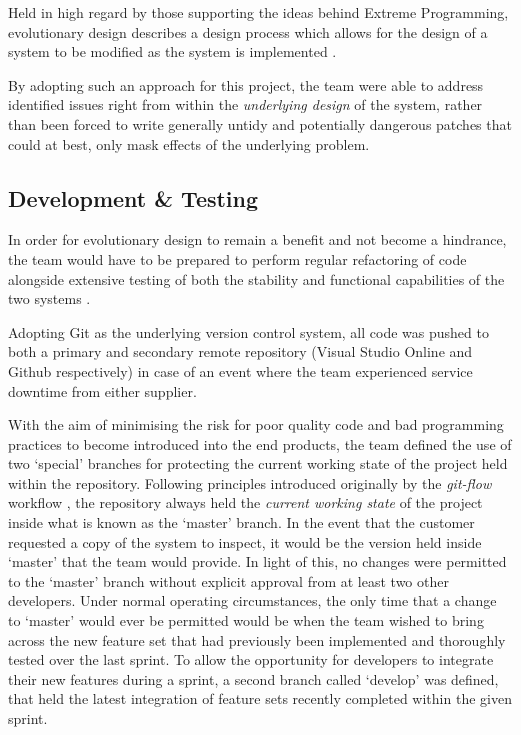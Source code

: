Held in high regard by those supporting the ideas behind Extreme Programming, evolutionary design describes a design process which allows for the design of a system to be modified as the system is implemented \cite{martin-fowler}. 

By adopting such an approach for this project, the team were able to address identified issues right from within the \textit{underlying design} of the system, rather than been forced to write generally untidy and potentially dangerous patches that could at best, only mask effects of the underlying problem.


\subsection{Development \& Testing}

In order for evolutionary design to remain a benefit and not become a hindrance, the team would have to be prepared to perform regular refactoring of code alongside extensive testing of both the stability and functional capabilities of the two systems \cite{martin-fowler}.

Adopting Git as the underlying version control system, all code was pushed to both a primary and secondary remote repository (Visual Studio Online and Github respectively) in case of an event where the team experienced service downtime from either supplier. 

With the aim of minimising the risk for poor quality code and bad programming practices to become introduced into the end products, the team defined the use of two `special' branches for protecting the current working state of the project held within the repository. Following principles introduced originally by the \textit{git-flow} workflow \cite{git-flow}, the repository always held the \textit{current working state} of the project inside what is known as the `master' branch. In the event that the customer requested a copy of the system to inspect, it would be the version held inside `master' that the team would provide. In light of this, no changes were permitted to the  `master' branch without explicit approval from at least two other developers. Under normal operating circumstances, the only time that a change to `master' would ever be permitted would be when the team wished to bring across the new feature set that had previously been implemented and thoroughly tested over the last sprint. To allow the opportunity for developers to integrate their new features during a sprint, a second branch called `develop' was defined, that held the latest integration of feature sets  recently completed within the given sprint. 

